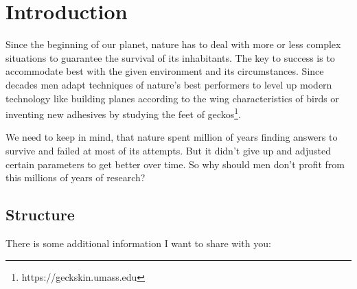 \chapter{Introduction}

Since the beginning of our planet, nature has to deal with more or less complex
situations to guarantee the survival of its inhabitants. The key to success is to
accommodate best with the given environment and its circumstances. Since decades
men adapt techniques of nature's best performers to level up modern technology like
building planes according to the wing characteristics of birds or inventing new
adhesives by studying the feet of geckos\footnote{https://geckskin.umass.edu}.

We need to keep in mind, that nature spent million of years finding answers to survive
and failed at most of its attempts. But it didn't give up and adjusted certain parameters
to get better over time. So why should men don't profit from this millions of years
of research?

\section{Structure}

There is some additional information I want to share with you: